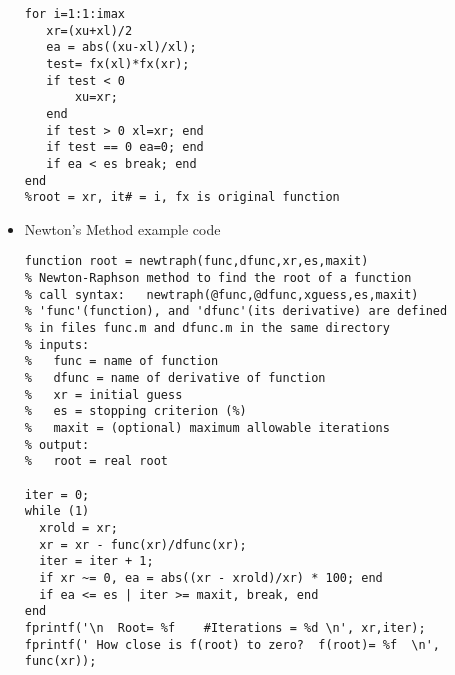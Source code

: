 \documentclass[fontsize=5pt]{scrartcl}
\begin{document}
\begin{multicols}{3}
\begin{itemize}
\begin{lstlisting}
for i=1:1:imax
   xr=(xu+xl)/2
   ea = abs((xu-xl)/xl);
   test= fx(xl)*fx(xr);
   if test < 0
       xu=xr;
   end
   if test > 0 xl=xr; end
   if test == 0 ea=0; end
   if ea < es break; end
end
%root = xr, it# = i, fx is original function
        \end{lstlisting}
        \item Newton's Method example code
          \lstset{language=Matlab}
          \begin{lstlisting}
function root = newtraph(func,dfunc,xr,es,maxit)
% Newton-Raphson method to find the root of a function
% call syntax:   newtraph(@func,@dfunc,xguess,es,maxit)
% 'func'(function), and 'dfunc'(its derivative) are defined 
% in files func.m and dfunc.m in the same directory
% inputs:
%   func = name of function 
%   dfunc = name of derivative of function 
%   xr = initial guess
%   es = stopping criterion (%)
%   maxit = (optional) maximum allowable iterations
% output:
%   root = real root

iter = 0;
while (1)
  xrold = xr;
  xr = xr - func(xr)/dfunc(xr);
  iter = iter + 1;
  if xr ~= 0, ea = abs((xr - xrold)/xr) * 100; end
  if ea <= es | iter >= maxit, break, end
end
fprintf('\n  Root= %f    #Iterations = %d \n', xr,iter);
fprintf(' How close is f(root) to zero?  f(root)= %f  \n', func(xr));
          \end{lstlisting}
        \end{itemize}

\end{multicols}
\end{document}
